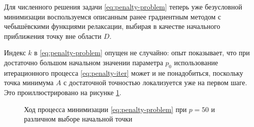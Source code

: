 \documentclass{article}
\theoremstyle{remark}
\theoremstyle{definition}
\numberwithin{equation}{section}
\begin{document}
Для численного решения задачи \eqref{eq:penalty-problem} теперь уже
безусловной минимизации воспользуемся описанным ранее градиентным
методом с чебышёвскими функциями релаксации, выбирая в качестве
начального приближения точку вне области $D$.

Индекс $k$ в \eqref{eq:penalty-problem} опущен не случайно: опыт
показывает, что при достаточно большом начальном значении параметра
$p_0$ использование итерационного процесса \eqref{eq:penalty-iter}
может и не понадобиться, поскольку точка минимума $A$ с достаточной
точностью локализуется уже на первом шаге. Это проиллюстрировано на
рисунке \ref{fig:penalty}.

\begin{figure}[!thb]
  \centering
  \caption{Ход процесса минимизации \eqref{eq:penalty-problem} при
    $p=50$ и различном выборе начальной точки}
  \label{fig:penalty}
\end{figure}

\clearpage
\appendix


\end{document}
